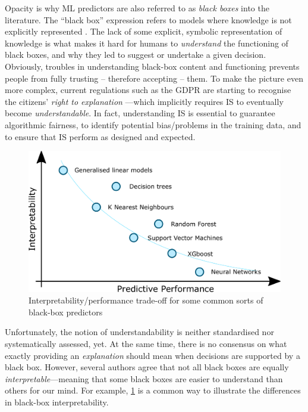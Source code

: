 \documentclass[12pt,a4paper,openright,twoside]{book}
\begin{document}
Opacity is why ML predictors are also referred to as \emph{black boxes} into the literature.
%
The ``black box'' expression refers to models where knowledge is not explicitly represented \cite{Lipton18}.
%
The lack of some explicit, symbolic representation of knowledge is what makes it hard for humans to \emph{understand} the functioning of black boxes, and why they led to suggest or undertake a given decision.
%
Obviously, troubles in understanding black-box content and functioning prevents people from fully trusting -- therefore accepting -- them.
%
To make the picture even more complex, current regulations such as the GDPR \cite{gdpr-voigt2017} are starting to recognise the citizens' \emph{right to explanation} \cite{explanation-aimag38}---which implicitly requires IS to eventually become \emph{understandable}.
%
In fact, understanding IS is essential to guarantee algorithmic fairness, to identify potential bias/problems in the training data, and to ensure that IS perform as designed and expected.

\begin{figure}
    \centering
    \includegraphics[width=.8\linewidth]{figures/interpretability-performance-tradeoff}
    \caption[Interpretability/performance trade-off]{Interpretability/performance trade-off for some common sorts of black-box predictors}
    \label{fig:tradeoff}
\end{figure}

Unfortunately, the notion of understandability is neither standardised nor systematically assessed, yet.
%
At the same time, there is no consensus on what exactly providing an \emph{explanation} should mean when decisions are supported by a black box.
%
However, several authors agree that not all black boxes are equally \emph{interpretable}---meaning that some black boxes are easier to understand than others for our mind.
%
For example, \cref{fig:tradeoff} is a common way to illustrate the differences in black-box interpretability.
\end{document}
